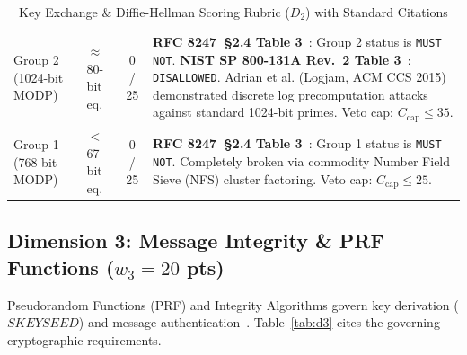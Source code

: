 \documentclass[11pt,a4paper]{article}
\begin{document}
\begin{table}[h!]
\begin{tabularx}{\textwidth}{llcX}
\addlinespace
Group 2 (1024-bit MODP) & $\approx$80-bit eq. & 0 / 25 & \textbf{RFC 8247~\S 2.4 Table 3}~\cite{rfc8247}: Group 2 status is \texttt{MUST NOT}. \textbf{NIST SP 800-131A Rev.~2 Table 3}~\cite{nist800-131ar2}: \texttt{DISALLOWED}. Adrian et al. (Logjam, ACM CCS 2015)~\cite{logjam} demonstrated discrete log precomputation attacks against standard 1024-bit primes. Veto cap: $C_{\text{cap}} \le 35$. \\
\addlinespace
Group 1 (768-bit MODP) & $<$67-bit eq. & 0 / 25 & \textbf{RFC 8247~\S 2.4 Table 3}~\cite{rfc8247}: Group 1 status is \texttt{MUST NOT}. Completely broken via commodity Number Field Sieve (NFS) cluster factoring. Veto cap: $C_{\text{cap}} \le 25$. \\
\bottomrule
\end{tabularx}
\caption{Key Exchange \& Diffie-Hellman Scoring Rubric ($D_2$) with Standard Citations}
\label{tab:d2}
\end{table}

\subsection{Dimension 3: Message Integrity \& PRF Functions ($w_3 = 20$ pts)}
Pseudorandom Functions (PRF) and Integrity Algorithms govern key derivation ($SKEYSEED$) and message authentication~\cite{rfc7296, fips180-4}. Table~\ref{tab:d3} cites the governing cryptographic requirements.
\end{document}
